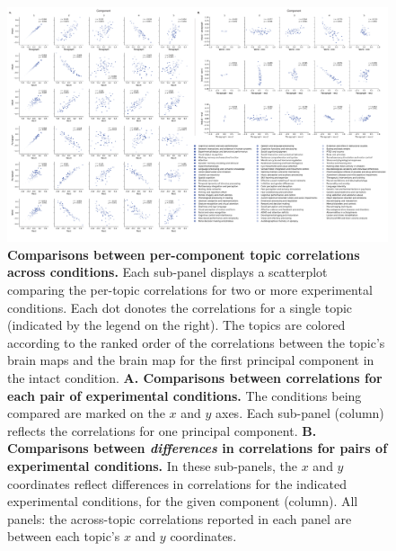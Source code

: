 \documentclass[english]{article}
\begin{document}
\begin{figure}[t]
  \centering
  \includegraphics[width=\textwidth]{figs/topic_contrasts}

\caption{\textbf{Comparisons between per-component topic correlations across conditions.}  Each sub-panel displays a scatterplot comparing the per-topic correlations for two or more experimental conditions.
Each dot donotes the correlations for a single topic (indicated by the legend on the right).  The topics are colored according to the ranked order of the correlations
between the topic's brain maps and the brain map for the first principal component in the intact condition.  \textbf{A. Comparisons between correlations for each pair of experimental conditions.}  The
conditions being compared are marked on the $x$ and $y$ axes.  Each sub-panel (column) reflects the correlations for one principal component.  \textbf{B. Comparisons between \textit{differences} in correlations for pairs of experimental conditions.}
In these sub-panels, the $x$ and $y$ coordinates reflect differences in correlations for the indicated experimental conditions, for the given component (column).
All panels: the across-topic correlations reported in each panel are between each topic's $x$ and $y$ coordinates.}

\label{fig:contrasts}

\end{figure}
\end{document}
